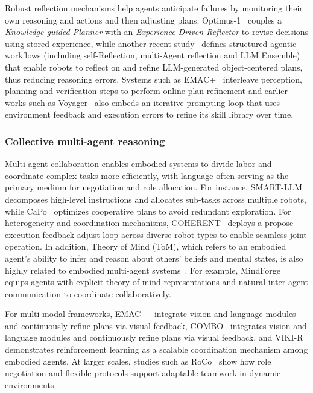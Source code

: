 Robust reflection mechanisms help agents anticipate failures by monitoring their own reasoning and actions and then adjusting plans. Optimus-1~\cite{li2024optimus1} couples a \emph{Knowledge-guided Planner} with an \emph{Experience-Driven Reflector} to revise decisions using stored experience, while another recent study~\cite{Moncada_Ramirez_2025} defines structured agentic workflows (including self-Reflection, multi-Agent reflection and LLM Ensemble) that enable robots to reflect on and refine LLM-generated object-centered plans, thus reducing reasoning errors. Systems such as EMAC+~\cite{ao2025emac} interleave perception, planning and verification steps to perform online plan refinement and earlier works such as Voyager~\cite{wang2023voyager} also embeds an iterative prompting loop that uses environment feedback and execution errors to refine its skill library over time.


\subsubsection{Collective multi-agent reasoning}
\label{sec:app-embodied-multi}


Multi-agent collaboration enables embodied systems to divide labor and coordinate complex tasks more efficiently, with language often serving as the primary medium for negotiation and role allocation. For instance, SMART-LLM~\cite{kannan2024smartllmsmartmultiagentrobot} decomposes high-level instructions and allocates sub-tasks across multiple robots, while CaPo~\cite{liu2024capo} optimizes cooperative plans to avoid redundant exploration. For heterogeneity and coordination mechanisms, COHERENT~\cite{liu2024coherent} deploys a propose-execution-feedback-adjust loop across diverse robot types to enable seamless joint operation. In addition, Theory of Mind (ToM), which refers to an embodied agent’s ability to infer and reason about others' beliefs and mental states, is also highly related to embodied multi-agent systems~\cite{li2023theory, wu2025large, cross2024hypothetical}. For example, MindForge~\cite{licua2024mindforge} equips agents with explicit theory-of-mind representations and natural inter-agent communication to coordinate collaboratively.


For multi-modal frameworks, EMAC+~\cite{ao2025emac} integrate vision and language modules and continuously refine plans via visual feedback, COMBO~\cite{zhang2025combocompositionalworldmodels} integrates vision and language modules and continuously refine plans via visual feedback, and VIKI-R~\cite{kang2025viki} demonstrates reinforcement learning as a scalable coordination mechanism among embodied agents. At larger scales, studies such as RoCo~\cite{mandi2024roco} show how role negotiation and flexible protocols support adaptable teamwork in dynamic environments.
